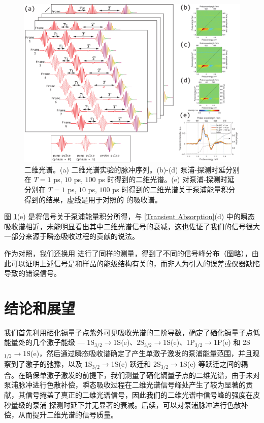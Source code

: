 \documentclass{thesis}
\begin{document}
\begin{figure}[h]
    \centering
    \includegraphics[width=1\columnwidth]{Img/2D Spectrum.pdf}
    \caption{二维光谱。(a) 二维光谱实验的脉冲序列。(b)-(d) 泵浦-探测时延分别在 $T=1$ ps, $10$ ps, $100$ ps 时得到的二维光谱。(e) 对泵浦-探测时延分别在 $T=1$ ps, $10$ ps, $100$ ps 时得到的二维光谱关于泵浦能量积分得到的结果，虚线是用于对照的  的吸收谱。}
    \label{2D Spectrum}
\end{figure}

图 \ref{2D Spectrum}(e) 是将信号关于泵浦能量积分所得，与 \ref{Transient Absorption}(d) 中的瞬态吸收谱相近，未能明显看出其中二维光谱信号的衰减，这也佐证了我们的信号很大一部分来源于瞬态吸收过程的贡献的说法。

作为对照，我们还换用  进行了同样的测量，得到了不同的信号峰分布（图略），由此可以证明上述信号是和样品的能级结构有关的，而非人为引入的误差或仪器缺陷导致的错误信号。

\chapter{结论和展望}
我们首先利用硒化镉量子点紫外可见吸收光谱的二阶导数，确定了硒化镉量子点低能量处的几个激子能级 --- 1S$_{3/2}\rightarrow$1S(e)、2S$_{3/2}\rightarrow$1S(e)、1P$_{3/2}\rightarrow$1P(e) 和 2S$_{1/2}\rightarrow$1S(e)，然后通过瞬态吸收谱确定了产生单激子激发的泵浦能量范围，并且观察到了激子的弛豫，以及 1S$_{3/2}\rightarrow$1S(e) 跃迁和 2S$_{3/2}\rightarrow$1S(e) 等跃迁之间的耦合。在确保单激子激发的前提下，我们测量了硒化镉量子点的二维光谱，由于未对泵浦脉冲进行色散补偿，瞬态吸收过程在二维光谱信号峰处产生了较为显著的贡献，其信号掩盖了真正的二维光谱信号，因此我们的二维光谱中信号峰的强度在皮秒量级的泵浦-探测时延下并无显著的衰减。后续，可以对泵浦脉冲进行色散补偿，从而提升二维光谱的信号质量。
\end{document}
